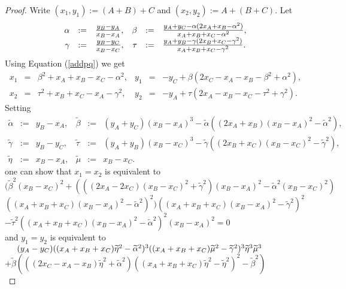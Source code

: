 \documentclass[12pt]{amsart}
\theoremstyle{plain}
\theoremstyle{remark}
\theoremstyle{definition}
\newcommand{\tmfrac}[2]{\mbox{\large$\frac{#1}{#2}$}}
\def\ba{\begin{array}}
\def\ea{\end{array}}
\begin{document}
\begin{proof}
Write $(x_1,y_1):=(A+B)+C$ and $(x_2,y_2):=A+(B+C)$.
Let
\[ \ba{rclrcl}
\alpha&:=&\tmfrac{y_B-y_A}{x_B-x_A}, &\beta&:=&\tmfrac{y_A+y_C-\alpha(2x_A+x_B-\alpha^2)}{x_A+x_B+x_C-\alpha^2}, \\
\gamma&:=&\tmfrac{y_B-y_C}{x_B-x_C}, &\tau&:=&\tmfrac{y_A+y_B-\gamma(2x_B+x_C-\gamma^2)}{x_A+x_B+x_C-\gamma^2}. \ea
\]
Using Equation (\ref{addpq})  we get
\[
\ba{rclrcl}
 x_1&=&\beta^2+x_A+x_B-x_C-\alpha^2, &  y_1&=&-y_C+\beta(2x_C-x_A-x_B-\beta^2+\alpha^2), \\
 x_2&=&\tau^2+x_B+x_C-x_A-\gamma^2, & y_2&=&-y_A+\tau(2x_A-x_B-x_C-\tau^2+\gamma^2). \ea \]
Setting
\[
\ba{rclrcl}
\widetilde\alpha&:=&y_B-x_A, &\widetilde\beta&:=&(y_A+y_C)(x_B-x_A)^3-\widetilde\alpha ((2x_A+x_B)(x_B-x_A)^2-\widetilde\alpha^2), \\
\widetilde\gamma&:=&y_B-y_C, &\widetilde\tau&:=&(y_A+y_B)(x_B-x_C)^3-        \widetilde\gamma((2x_B+x_C)(x_B-x_C)^2-\widetilde\gamma^2),\\
\widetilde\eta&:=&x_B-x_A, &\widetilde\mu&:=&x_B-x_C.
\ea \]
one can show that $x_1=x_2$ is equivalent to
\vspace{0.4cm}\\
\hspace*{0.5cm}$(\widetilde\beta^2(x_B-x_C)^2+(((2x_A-2x_C)(x_B-x_C)^2
    +\widetilde\gamma^2)(x_B-x_A)^2-\widetilde\alpha^2(x_B-x_C)^2)$\\[0.1cm]
\vspace{0.1cm}
\hspace*{0.5cm}$((x_A+x_B+x_C)(x_B-x_A)^2-\widetilde\alpha^2)^2)((x_A+x_B+x_C)
     (x_B-x_A)^2-\widetilde\gamma^2)^2$\\[0.1cm]
\vspace{0.1cm}
$-\widetilde\tau^2((x_A+x_B+x_C)(x_B-x_A)^2-\widetilde\alpha^2)^2(x_B-x_A)^2=0$\\[0.3cm]
and $y_1=y_2$ is equivalent to
\vspace{0.4cm}\\
$\hspace*{0.5cm}(y_A-y_C)((x_A+x_B+x_C)\widetilde\eta^2-\widetilde\alpha^2)^3
((x_A+x_B+x_C)\widetilde\mu^2-\widetilde\gamma^2)^3\widetilde\eta^3\widetilde\mu^3$\\[0.1cm]
\vspace*{0.1cm}
$+\widetilde\beta(((2x_C-x_A-x_B)\widetilde\eta^2+\widetilde\alpha^2)((x_A+x_B+x_C)
 \widetilde\eta^2-\widetilde\eta^2)^2-\widetilde\beta^2)$\\
\vspace{0.1cm}

\end{proof}
\end{document}
